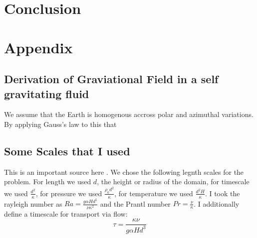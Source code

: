 \documentclass{article}
\begin{document}
\section*{Conclusion}


\section*{Appendix}

\subsection*{Derivation of Graviational Field in a self gravitating fluid}
We assume that the Earth is homogenous accross polar and azimuthal variations. By applying Gauss's law to this that 


\subsection*{Some Scales that I used}
This is an important source here \cite{goluskin2016internally}.
\newline
We chose the following legnth scales for the problem. For length we used $d$, the height or radius of the domain, 
for timescale we used $\frac{d^2}{\kappa}$, for pressure we used $\frac{\rho_0 d^2}{\kappa}$, for temperature we used $\frac{d^2 H}{\kappa}$. 
I took the rayleigh number as $Ra = \frac{g \alpha H d^5}{\nu \kappa^2}$ and the Prantl number $Pr = \frac{\nu}{\kappa}$. I additionally define a timescale for transport via flow:
\begin{equation}
	\tau = \frac{\kappa \nu}{g \alpha H d^3}
\end{equation}






\end{document}
